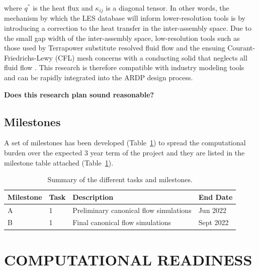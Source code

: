 \documentclass[11pt,letterpaper,english]{article}
\begin{document}
where \(q^{''}\) is the heat flux and \(\kappa_{ij}\) is a diagonal tensor. In other words, the mechanism by which the LES database will inform lower-resolution tools is by introducing a correction to the heat transfer in the inter-assembly space. Due to the small gap width of the inter-assembly space, low-resolution tools such as those used by Terrapower substitute resolved fluid flow and the ensuing Courant-Friedrichs-Lewy (CFL) mesh concerns with a conducting solid that neglects all fluid flow \cite{touran}. This research is therefore compatible with industry modeling tools and can be rapidly integrated into the ARDP design process.

{\bf Does this research plan sound reasonable?}


\vspace{-.25in}
\subsection{Milestones}
\vspace{-.2in}


A set of milestones has been developed (Table~\ref{tab:milestones}) to spread the computational burden over
the expected 3 year term of the project and they are listed in the milestone table attached (Table~\ref{tab:milestones}).

\begin{table}
\centering
\caption{Summary of the different tasks and milestones.}
\begin{tabular}{llll}
\hline
\hline
Milestone & Task & Description & End Date \\
\hline
\hline
A & 1 & Preliminary canonical flow simulations   & Jun  2022 \\
B & 1 & Final canonical flow simulations         & Sept 2022 \\
\hline
\hline
\end{tabular}
\label{tab:milestones}
\end{table}

\vspace{-.25in}
\section{COMPUTATIONAL READINESS} %
\vspace{-.2in}
\end{document}
